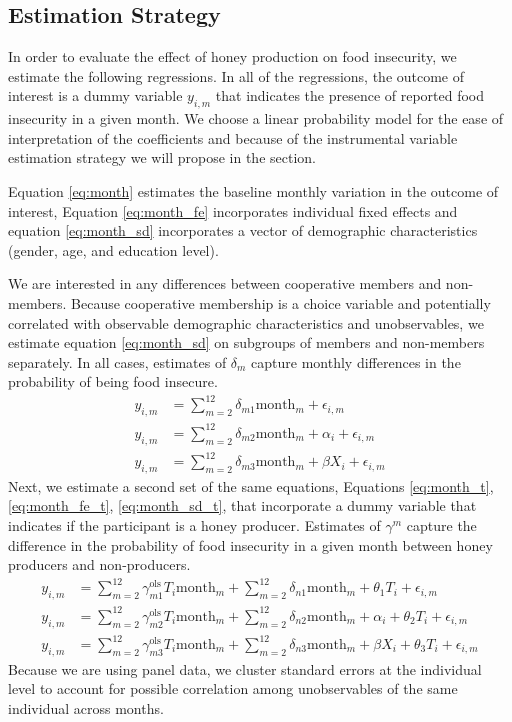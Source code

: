 \documentclass[../main.tex]{subfiles}
\begin{document}
\subsection{Estimation Strategy}
In order to evaluate the effect of honey
production on food insecurity, we estimate
the following regressions. In all of the regressions, 
the outcome of interest is a dummy variable $y_{i,m}$ that indicates
the presence of reported food insecurity in a given month.
We choose a linear probability model for the ease of interpretation
of the coefficients and because of the instrumental variable estimation
strategy we will propose in the section.

Equation \ref{eq:month} estimates
the baseline monthly variation in the outcome of interest,
Equation \ref{eq:month_fe} incorporates
individual fixed effects and equation \ref{eq:month_sd} incorporates
a vector of demographic characteristics (gender, age, and education level).

We are interested in any differences between cooperative members and non-members.
Because cooperative membership is a choice variable and potentially correlated
with observable demographic characteristics and unobservables, we estimate
equation \ref{eq:month_sd} on subgroups of members and non-members separately.
In all cases, estimates of $\delta_m$ capture monthly differences in the
probability of being food insecure.
\begin{align}
\label{eq:month}
 y_{i,m} &= \sum_{m=2}^{12} \delta_{m1} \text{month}_{m} + \epsilon_{i,m}  \\
 \label{eq:month_fe}
 y_{i,m} &= \sum_{m=2}^{12} \delta_{m2} \text{month}_{m} + \alpha_i + \epsilon_{i,m}  \\
  \label{eq:month_sd}
 y_{i,m} &= \sum_{m=2}^{12} \delta_{m3} \text{month}_{m} + \beta X_i +\epsilon_{i,m}  
\end{align}
Next, we estimate a second set of the same equations,
Equations \ref{eq:month_t}, \ref{eq:month_fe_t}, \ref{eq:month_sd_t}, 
that incorporate a dummy variable
that indicates if the participant is a honey producer. Estimates of 
$\gamma^m$ capture the difference in the probability of food insecurity in a given month between honey producers and non-producers.
\begin{align}
\label{eq:month_t}
 y_{i,m} &= \sum_{m=2}^{12} \gamma_{m1}^{\text{ols}} T_i \text{month}_{m} + 
 \sum_{m=2}^{12} \delta_{n1} \text{month}_{m} + \theta_1 T_i 
 + \epsilon_{i,m}  \\
 \label{eq:month_fe_t}
 y_{i,m} &= \sum_{m=2}^{12} \gamma_{m2}^{\text{ols}} T_i \text{month}_{m} + 
 \sum_{m=2}^{12} \delta_{n2} \text{month}_{m} + \alpha_i + \theta_2 T_i + \epsilon_{i,m}  \\
  \label{eq:month_sd_t}
 y_{i,m} &= \sum_{m=2}^{12} \gamma_{m3}^{\text{ols}} T_i \text{month}_{m} + 
 \sum_{m=2}^{12} \delta_{n3} \text{month}_{m} + \beta X_i + \theta_3 T_i +\epsilon_{i,m}  
\end{align}
Because we are using panel data, we cluster standard errors at the individual level
to account for possible correlation among unobservables of the same
individual across months.
\end{document}
